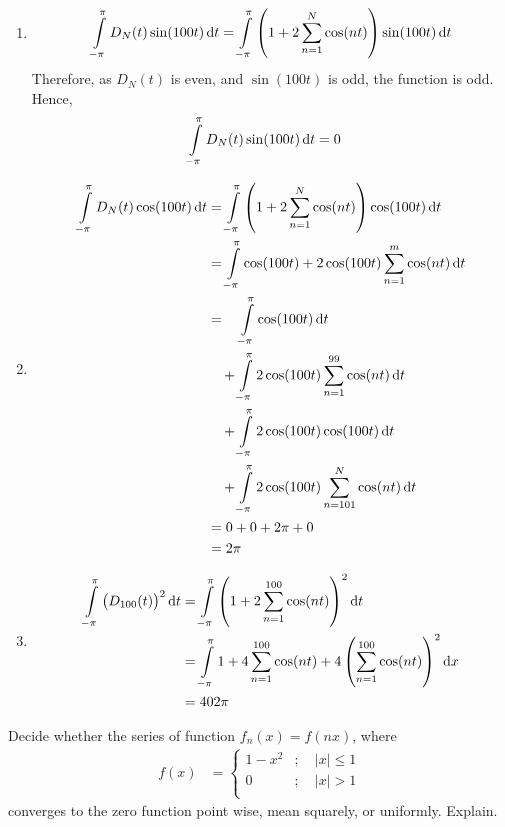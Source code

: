 \documentclass[fleqn, a4paper, 11pt, oneside]{amsart}
\theoremstyle{definition}
\theoremstyle{theorem}
\begin{document}
\begin{solution}
	\begin{enumerate}[leftmargin=*]
		\item
			\begin{align*}
				\int\limits_{-\pi}^{\pi} D_N(t) \sin(100 t) \dif t &= \int\limits_{-\pi}^{\pi} \left( 1 + 2 \sum\limits_{n = 1}^{N} \cos(n t) \right) \sin(100 t) \dif t\\
			\end{align*}
			Therefore, as $D_N(t)$ is even, and $\sin(100 t)$ is odd, the function is odd.\\
			Hence,
			\begin{align*}
				\int\limits_{-\pi}^{\pi} D_N(t) \sin(100 t) \dif t &= 0
			\end{align*}
		\item
			\begin{align*}
				\int\limits_{-\pi}^{\pi} D_N(t) \cos(100 t) \dif t &= \int\limits_{-\pi}^{\pi} \left( 1 + 2 \sum\limits_{n = 1}^{N} \cos(n t) \right) \cos(100 t) \dif t\\
				&= \int\limits_{-\pi}^{\pi} \cos(100 t) + 2 \cos(100 t) \sum\limits_{n = 1}^{m} \cos(n t) \dif t\\
				&= \quad \int\limits_{-\pi}^{\pi} \cos(100 t) \dif t\\
				&\quad + \int\limits_{-\pi}^{\pi} 2 \cos(100 t) \sum\limits_{n = 1}^{99} \cos(n t) \dif t\\
				&\quad + \int\limits_{-\pi}^{\pi} 2 \cos(100 t) \cos(100 t) \dif t\\
				&\quad + \int\limits_{-\pi}^{\pi} 2 \cos(100 t) \sum\limits_{n = 101}^{N} \cos(n t) \dif t\\
				&= 0 + 0 + 2 \pi + 0\\
				&= 2 \pi
			\end{align*}
		\item
			\begin{align*}
				\int\limits_{-\pi}^{\pi} \left( D_{100}(t) \right)^2 \dif t &= \int\limits_{-\pi}^{\pi} \left( 1 + 2 \sum\limits_{n = 1}^{100} \cos(n t) \right)^2 \dif t\\
				&= \int\limits_{-\pi}^{\pi} 1 + 4 \sum\limits_{n = 1}^{100} \cos(n t) + 4 \left( \sum\limits_{n = 1}^{100} \cos(n t) \right)^2 \dif x\\
				&= 402 \pi
			\end{align*}
	\end{enumerate}
\end{solution}

\begin{question}
	Decide whether the series of function $f_n(x) = f(n x)$, where
	\begin{align*}
		f(x) &=
			\begin{cases}
				1 - x^2 &;\quad |x| \le 1\\
				0 &;\quad |x| > 1\\
			\end{cases}
	\end{align*}
	converges to the zero function point wise, mean squarely, or uniformly.
	Explain.
\end{question}
\end{document}
